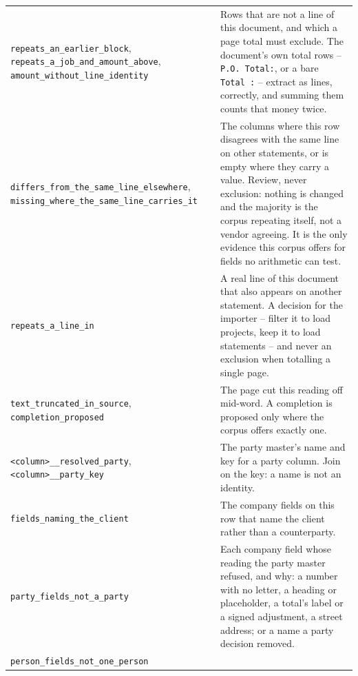 \documentclass[
]{article}
\begin{document}
{\begin{longtable}[]{@{}
  >{\raggedright\arraybackslash}p{}
  >{\raggedright\arraybackslash}p{}@{}}
\texttt{repeats\_\allowbreak{}an\_\allowbreak{}earlier\_\allowbreak{}block},
\texttt{repeats\_\allowbreak{}a\_\allowbreak{}job\_\allowbreak{}and\_\allowbreak{}amount\_\allowbreak{}above},
\texttt{amount\_\allowbreak{}without\_\allowbreak{}line\_\allowbreak{}identity}
& Rows that are not a line of this document, and which a page total must
exclude. The document's own total rows -- \texttt{P.O.\ Total:}, or a
bare \texttt{Total\ :} -- extract as lines, correctly, and summing them
counts that money twice. \\
\texttt{differs\_\allowbreak{}from\_\allowbreak{}the\_\allowbreak{}same\_\allowbreak{}line\_\allowbreak{}elsewhere},
\texttt{missing\_\allowbreak{}where\_\allowbreak{}the\_\allowbreak{}same\_\allowbreak{}line\_\allowbreak{}carries\_\allowbreak{}it}
& The columns where this row disagrees with the same line on other
statements, or is empty where they carry a value. Review, never
exclusion: nothing is changed and the majority is the corpus repeating
itself, not a vendor agreeing. It is the only evidence this corpus
offers for fields no arithmetic can test. \\
\texttt{repeats\_\allowbreak{}a\_\allowbreak{}line\_\allowbreak{}in} & A
real line of this document that also appears on another statement. A
decision for the importer -- filter it to load projects, keep it to load
statements -- and never an exclusion when totalling a single page. \\
\texttt{text\_\allowbreak{}truncated\_\allowbreak{}in\_\allowbreak{}source},
\texttt{completion\_\allowbreak{}proposed} & The page cut this reading
off mid-word. A completion is proposed only where the corpus offers
exactly one. \\
\texttt{<column>\_\allowbreak{}\_\allowbreak{}resolved\_\allowbreak{}party},
\texttt{<column>\_\allowbreak{}\_\allowbreak{}party\_\allowbreak{}key} &
The party master's name and key for a party column. Join on the key: a
name is not an identity. \\
\texttt{fields\_\allowbreak{}naming\_\allowbreak{}the\_\allowbreak{}client}
& The company fields on this row that name the client rather than a
counterparty. \\
\texttt{party\_\allowbreak{}fields\_\allowbreak{}not\_\allowbreak{}a\_\allowbreak{}party}
& Each company field whose reading the party master refused, and why: a
number with no letter, a heading or placeholder, a total's label or a
signed adjustment, a street address; or a name a party decision
removed. \\
\texttt{person\_\allowbreak{}fields\_\allowbreak{}not\_\allowbreak{}one\_\allowbreak{}person}

\end{longtable}}
\end{document}

